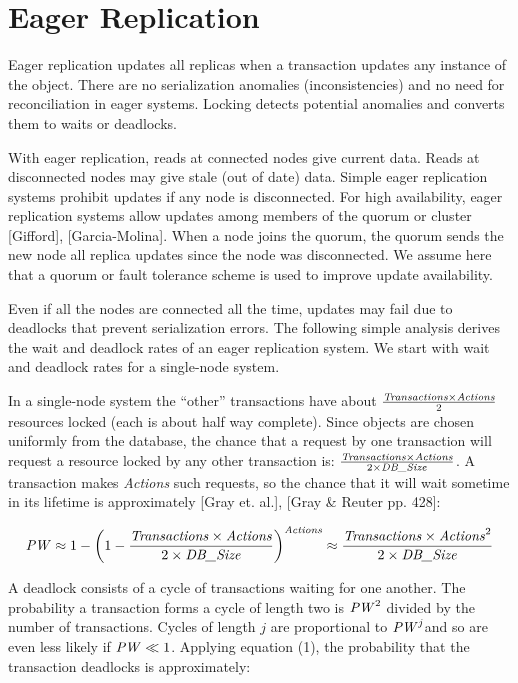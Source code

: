 \documentclass[a4paper,12pt,twoside,openright]{article}
\begin{document}
\section{Eager Replication}

Eager replication updates all replicas when a transaction updates any
instance of the object. There are no serialization anomalies
(inconsistencies) and no need for reconciliation in eager systems.
Locking detects potential anomalies and converts them to waits or
deadlocks.

With eager replication, reads at connected nodes give current data.
Reads at disconnected nodes may give stale (out of date) data. Simple
eager replication systems prohibit updates if any node is disconnected.
For high availability, eager replication systems allow updates among
members of the quorum or cluster {[}Gifford{]}, {[}Garcia-Molina{]}.
When a node joins the quorum, the quorum sends the new node all replica
updates since the node was disconnected. We assume here that a quorum or
fault tolerance scheme is used to improve update availability.

Even if all the nodes are connected all the time, updates may fail due
to deadlocks that prevent serialization errors. The following simple
analysis derives the wait and deadlock rates of an eager replication
system. We start with wait and deadlock rates for a single-node system.

In a single-node system the ``other'' transactions have about
\(\frac{\text{\emph{Transactions}} \times \text{\emph{Actions}}}{2}\) resources
locked (each is about half way complete). Since objects are chosen
uniformly from the database, the chance that a request by one
transaction will request a resource locked by any other transaction is:
\(\frac{\text{\emph{Transactions}} \times \text{\emph{Actions}}}{2 \times \text{\emph{DB\_Size}}}\).
A transaction makes \emph{Actions} such requests, so the chance that
it will wait sometime in its lifetime is approximately {[}Gray et.
al.{]}, {[}Gray \& Reuter pp. 428{]}:

\begin{equation}
  \text{\emph{PW}} \approx 1 - \left( 1 - \frac{\text{\emph{Transactions}} \times \text{\emph{Actions}}}{2 \times \text{\emph{DB\_Size}}} \right)^\text{\emph{Actions}}
     \approx \frac{\text{\emph{Transactions}} \times \text{\emph{Actions}}^2}{2 \times \text{\emph{DB\_Size}}}
\end{equation}

A deadlock consists of a cycle of transactions waiting for one another.
The probability a transaction forms a cycle of length two is
\(\text{\emph{PW}}^2\) divided by the number of transactions.
Cycles of length \(j\) are proportional to \(\text{\emph{PW}}^j\)and so are even less likely
if \(\text{\emph{PW}} \ll 1\).
Applying equation (1), the probability that the transaction deadlocks is
approximately:
\end{document}
